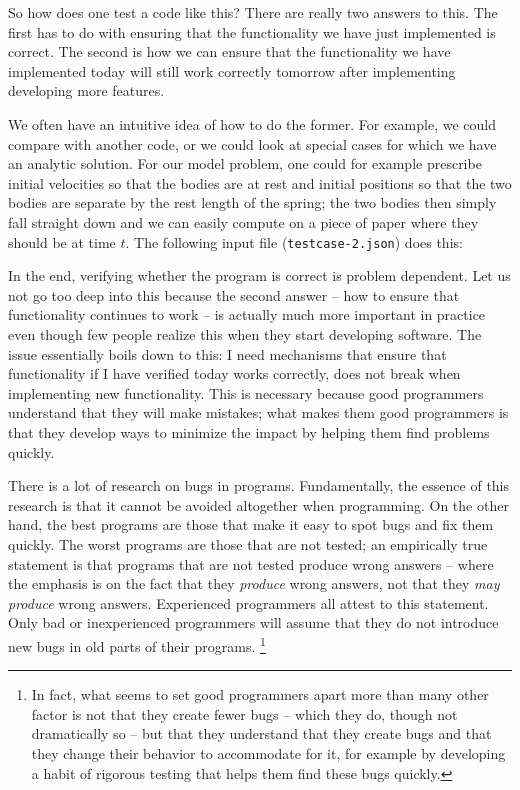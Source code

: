 \documentclass{article}
\begin{document}
So how does one test a code like this? There are really two answers to
this. The first has to do with ensuring that the functionality we have just
implemented is correct. The second is how we can ensure that the functionality
we have implemented today will still work correctly tomorrow after
implementing developing more features.

We often have an intuitive idea of how to do the former. For example, we could
compare with another code, or we could look at special cases for which we have
an analytic solution. For our model problem, one could for example prescribe
initial velocities so that the bodies are at rest and initial positions so
that the two bodies are separate by the rest length of the spring; the two
bodies then simply fall straight down and we can easily compute on a piece of
paper where they should be at time $t$. The following input file
(\texttt{testcase-2.json}) does this:


In the end, verifying whether the program is correct is problem dependent. Let
us not go too deep into this because the second answer -- how to ensure that
functionality continues to work -- is actually much more important in practice
even though few people realize this when they start developing software. The
issue essentially boils down to this: I need mechanisms that ensure that
functionality if I have verified today works correctly, does not break when
implementing new functionality. This is necessary because good programmers
understand that they will make mistakes; what makes them good programmers is
that they develop ways to minimize the impact by helping them find problems
quickly. 

There is a lot of research on bugs in programs. Fundamentally, the essence of
this research is that it cannot be avoided altogether when programming. On the
other hand, the best programs are those that make it easy to spot bugs and fix
them quickly. The worst programs are those that are not tested; an empirically
true statement is that programs that are not tested produce wrong answers --
where the emphasis is on the fact that they \textit{produce} wrong answers,
not that they \textit{may produce} wrong answers. Experienced programmers all
attest to this statement. Only bad or inexperienced programmers will assume
that they do not introduce new bugs in old parts of their programs.%
\footnote{In fact, what seems to set good programmers apart more than many
  other factor is not that they create fewer bugs -- which they do, though not
  dramatically so -- but that they understand that they create bugs and that
  they change their behavior to accommodate for it, for example by developing
  a habit of rigorous testing that helps them find these bugs quickly.}
\end{document}

